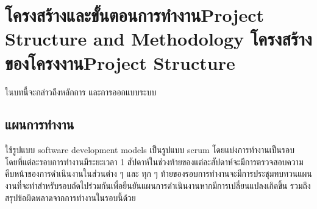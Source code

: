 \chapter{\ifproject%
\ifcpe โครงสร้างและขั้นตอนการทำงาน\else Project Structure and Methodology\fi
\else%
\ifcpe โครงสร้างของโครงงาน\else Project Structure\fi
\fi
}

ในบทนี้จะกล่าวถึงหลักการ และการออกแบบระบบ

\makeatletter


\makeatother

\section{แผนการทำงาน}
\quad ใช้รูปแบบ software development models เป็นรูปแบบ scrum โดยแบ่งการทำงานเป็นรอบ 
โดยที่แต่ละรอบการทำงานมีระยะเวลา 1 สัปดาห์ในช่วงท้ายของแต่ละสัปดาห์จะมีการตรวจสอบความคืบหน้าของการดำเนินงานในส่วนต่าง ๆ 
และ ทุก ๆ ท้ายของรอบการทำงานจะมีการประชุมทบทวนแผนงานที่จะทำสำหรับรอบถัดไปร่วมกันเพื่อยืนยันแผนการดำเนินงานหากมีการเปลี่ยนแปลงเกิดขึ้น 
รวมถึงสรุปข้อผิดพลาดจากการทำงานในรอบนี้ด้วย
